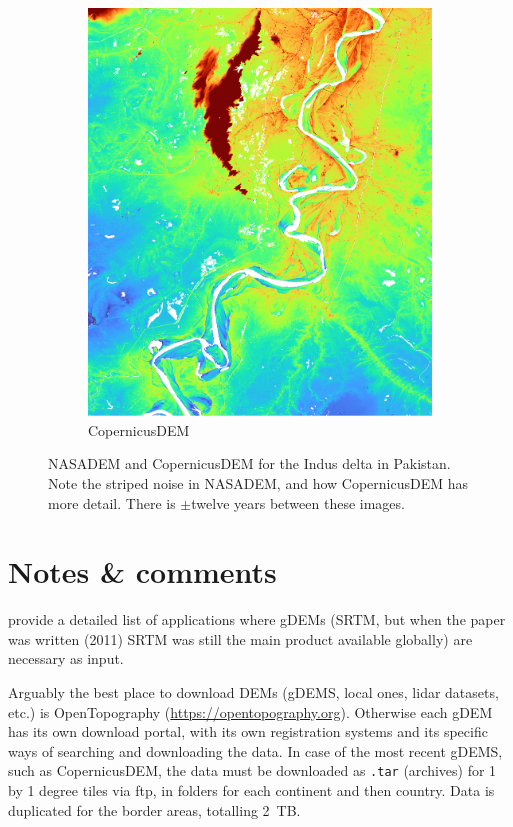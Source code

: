 \begin{figure}
\begin{subfigure}{0.45\linewidth}
    \includegraphics[width=\linewidth]{copernicusdem.png}
    \caption{CopernicusDEM}\label{fig:copernicusdem}
  \end{subfigure}
  \caption{NASADEM and CopernicusDEM for the Indus delta in Pakistan. Note the striped noise in NASADEM, and how CopernicusDEM has more detail. There is $\pm$twelve years between these images.}%
\label{fig:dem_comparison}
\end{figure}


%
\section{Notes \& comments}

\citet{Yang11} provide a detailed list of applications where gDEMs (SRTM, but when the paper was written (2011) SRTM was still the main product available globally) are necessary as input.

Arguably the best place to download DEMs (gDEMS, local ones, lidar datasets, etc.) is OpenTopography (\url{https://opentopography.org}).
Otherwise each gDEM has its own download portal, with its own registration systems and its specific ways of searching and downloading the data.
In case of the most recent gDEMS, such as CopernicusDEM, the data must be downloaded as \texttt{.tar} (archives) for 1 by 1 degree tiles via ftp, in folders for each continent and then country.
Data is duplicated for the border areas, totalling \qty{2}{TB}.

